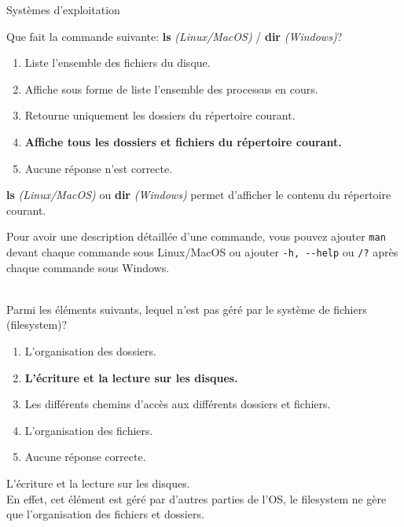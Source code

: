 \begin{section}{Systèmes d'exploitation}
    \begin{Exercice}[5 minutes]
        Que fait la commande suivante: \textbf{ls} \textit{(Linux/MacOS)} / \textbf{dir} \textit{(Windows)}?
        \begin{enumerate}
            \item Liste l'ensemble des fichiers du disque.
            \item Affiche sous forme de liste l'ensemble des processus en cours.
            \item Retourne uniquement les dossiers du répertoire courant.
            \item \textbf{Affiche tous les dossiers et fichiers du répertoire courant.}
            \item Aucune réponse n'est correcte.
        \end{enumerate}
        \begin{solution}
            \textbf{ls} \textit{(Linux/MacOS)} ou \textbf{dir} \textit{(Windows)} permet d'afficher le contenu du répertoire courant.
        \end{solution}
        \begin{conseil}
            Pour avoir une description détaillée d'une commande, vous pouvez ajouter \lstinline{man} devant chaque commande sous Linux/MacOS ou ajouter \lstinline{-h, --help} ou \lstinline{/?} après chaque commande sous Windows.
        \end{conseil}
    \end{Exercice}
    
     \begin{Exercice}[5 minutes]\\
    Parmi les éléments suivants, lequel n'est pas géré par le système de fichiers (filesystem)?
        \begin{enumerate}
            \item L'organisation des dossiers.
            \item \textbf{L'écriture et la lecture sur les disques.}
            \item Les différents chemins d'accès aux différents dossiers et fichiers.
            \item L'organisation des fichiers.
            \item Aucune réponse correcte.
        \end{enumerate}
    \end{Exercice}
    
    \begin{solution}
        L'écriture et la lecture sur les disques. \\
	
	En effet, cet élément est géré par d'autres parties de l'OS, le filesystem ne gère que l'organisation des fichiers et dossiers. \\ 
    \end{solution}
    
\end{section}
